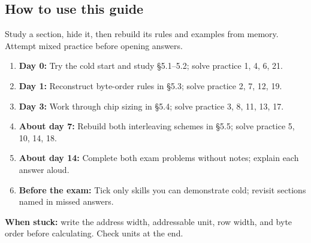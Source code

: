 \documentclass[11pt]{article}
\begin{document}
\begin{keepsection}
\section{How to use this guide}

Study a section, hide it, then rebuild its rules and examples from memory. Attempt mixed practice before opening answers.

\begin{enumerate}
\item \textbf{Day 0:} Try the cold start and study §5.1–5.2; solve practice 1, 4, 6, 21.
\item \textbf{Day 1:} Reconstruct byte-order rules in §5.3; solve practice 2, 7, 12, 19.
\item \textbf{Day 3:} Work through chip sizing in §5.4; solve practice 3, 8, 11, 13, 17.
\item \textbf{About day 7:} Rebuild both interleaving schemes in §5.5; solve practice 5, 10, 14, 18.
\item \textbf{About day 14:} Complete both exam problems without notes; explain each answer aloud.
\item \textbf{Before the exam:} Tick only skills you can demonstrate cold; revisit sections named in missed answers.
\end{enumerate}

\begin{notebox}\textbf{When stuck:} write the address width, addressable unit, row width, and byte order before calculating. Check units at the end.\end{notebox}
\end{keepsection}
\end{document}
